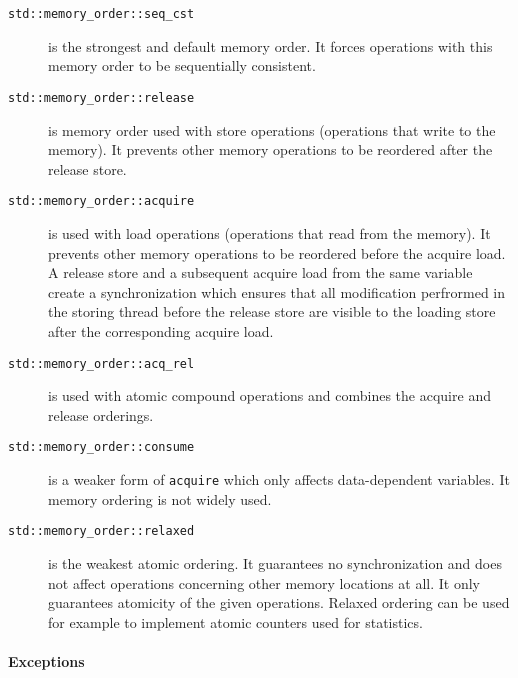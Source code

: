 \begin{description}
    \item[\texttt{std::memory\_order::seq\_cst}] is the strongest and default
        memory order.
        It forces operations with this memory order to be sequentially
        consistent.

        \item[\texttt{std::memory\_order::release}] is memory order used with
            store operations (operations that write to the memory).
            It prevents other memory operations to be reordered after the
            release store.

        \item[\texttt{std::memory\_order::acquire}] is used with load operations
            (operations that read from the memory).
            It prevents other memory operations to be reordered before the
            acquire load.
            A release store and a subsequent acquire load from the same variable
            create a synchronization which ensures that all modification
            perfrormed in the storing thread before the release store are
            visible to the loading store after the corresponding acquire load.

        \item[\texttt{std::memory\_order::acq\_rel}] is used with atomic
            compound operations and combines the acquire and release orderings.

        \item[\texttt{std::memory\_order::consume}] is a weaker form of
            \texttt{acquire} which only affects data-dependent variables.
            It memory ordering is not widely used.

        \item[\texttt{std::memory\_order::relaxed}] is the weakest atomic
            ordering.
            It guarantees no synchronization and does not affect operations
            concerning other memory locations at all.
            It only guarantees atomicity of the given operations.
            Relaxed ordering can be used for example to implement atomic
            counters used for statistics.
\end{description}

\paragraph{Exceptions}

